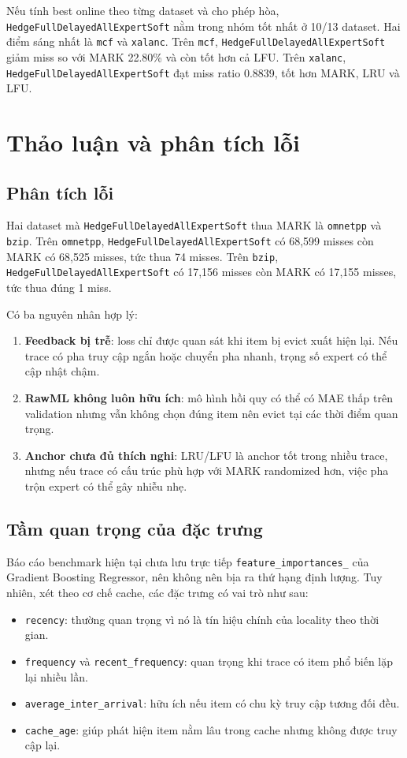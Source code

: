 \documentclass[11pt,a4paper]{article}
\newcommand{\code}[1]{\texttt{#1}}
\newcommand{\hedge}{\code{HedgeFullDelayedAllExpertSoft}}
\begin{document}
Nếu tính best online theo từng dataset và cho phép hòa, \hedge{} nằm trong nhóm tốt nhất ở 10/13 dataset. Hai điểm sáng nhất là \code{mcf} và \code{xalanc}. Trên \code{mcf}, \hedge{} giảm miss so với MARK 22.80\% và còn tốt hơn cả LFU. Trên \code{xalanc}, \hedge{} đạt miss ratio 0.8839, tốt hơn MARK, LRU và LFU.

\section{Thảo luận và phân tích lỗi}

\subsection{Phân tích lỗi}

Hai dataset mà \hedge{} thua MARK là \code{omnetpp} và \code{bzip}. Trên \code{omnetpp}, \hedge{} có 68,599 misses còn MARK có 68,525 misses, tức thua 74 misses. Trên \code{bzip}, \hedge{} có 17,156 misses còn MARK có 17,155 misses, tức thua đúng 1 miss.

Có ba nguyên nhân hợp lý:

\begin{enumerate}[leftmargin=1.4em]
    \item \textbf{Feedback bị trễ}: loss chỉ được quan sát khi item bị evict xuất hiện lại. Nếu trace có pha truy cập ngắn hoặc chuyển pha nhanh, trọng số expert có thể cập nhật chậm.
    \item \textbf{RawML không luôn hữu ích}: mô hình hồi quy có thể có MAE thấp trên validation nhưng vẫn không chọn đúng item nên evict tại các thời điểm quan trọng.
    \item \textbf{Anchor chưa đủ thích nghi}: LRU/LFU là anchor tốt trong nhiều trace, nhưng nếu trace có cấu trúc phù hợp với MARK randomized hơn, việc pha trộn expert có thể gây nhiễu nhẹ.
\end{enumerate}

\subsection{Tầm quan trọng của đặc trưng}

Báo cáo benchmark hiện tại chưa lưu trực tiếp \code{feature\_importances\_} của Gradient Boosting Regressor, nên không nên bịa ra thứ hạng định lượng. Tuy nhiên, xét theo cơ chế cache, các đặc trưng có vai trò như sau:

\begin{itemize}[leftmargin=1.4em]
    \item \code{recency}: thường quan trọng vì nó là tín hiệu chính của locality theo thời gian.
    \item \code{frequency} và \code{recent\_frequency}: quan trọng khi trace có item phổ biến lặp lại nhiều lần.
    \item \code{average\_inter\_arrival}: hữu ích nếu item có chu kỳ truy cập tương đối đều.
    \item \code{cache\_age}: giúp phát hiện item nằm lâu trong cache nhưng không được truy cập lại.
\end{itemize}
\end{document}
